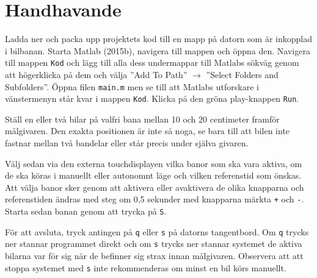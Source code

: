 \section{Handhavande}
\label{app:handhavande}

Ladda ner och packa upp projektets kod till en mapp på datorn som är inkopplad i
bilbanan. Starta Matlab (2015b), navigera till mappen och öppna den.
Navigera till mappen \texttt{Kod} och lägg till alla dess undermappar till Matlabs
sökväg genom att högerklicka på dem och välja ''Add To Path'' $\rightarrow$
''Select Folders and Subfolders''. Öppna filen \texttt{main.m} men se till att
Matlabs utforskare i vänstermenyn står kvar i mappen \texttt{Kod}. Klicka på
den gröna play-knappen \texttt{Run}.


Ställ en eller två bilar på valfri bana mellan 10 och 20 centimeter framför
målgivaren. Den exakta positionen är inte så noga, se bara till att bilen inte
fastnar mellan två bandelar eller står precis under själva givaren.

Välj sedan via den externa touchdisplayen vilka banor som ska vara aktiva, om de
ska köras i manuellt eller autonomnt läge och vilken referenstid som önskas.
Att välja banor sker genom att aktivera eller avaktivera de olika knapparna och
referenstiden ändras med steg om 0,5 sekunder med knapparna märkta \texttt{+}
och \texttt{-}. Starta sedan banan genom att trycka på \texttt{S}.


För att avsluta, tryck antingen på \texttt{q} eller \texttt{s} på datorns
tangentbord. Om \texttt{q} trycks ner stannar programmet direkt och om
\texttt{s} trycks ner stannar systemet de aktiva bilarna var för sig när de
befinner sig strax innan målgivaren. Observera att att stoppa systemet med
\texttt{s} inte rekommenderas om minst en bil körs manuellt.

